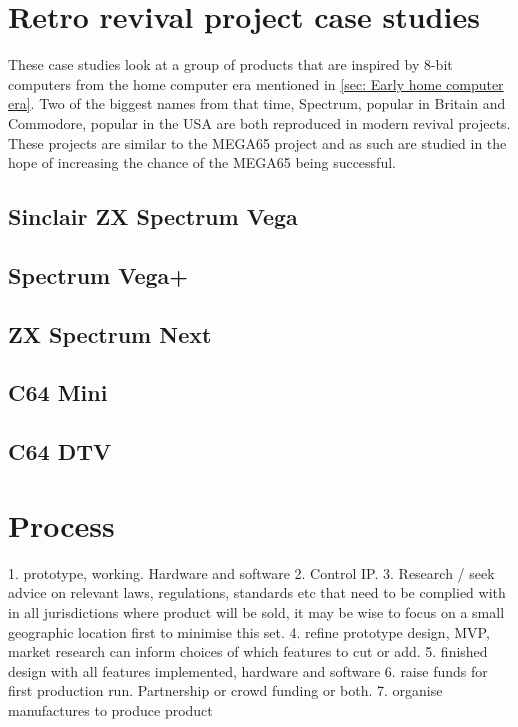\section{Retro revival project case studies}
These case studies look at a group of products that are inspired by 8-bit computers from the home computer era mentioned in \ref{sec: Early home computer era}. Two of the biggest names from that time, Spectrum, popular in Britain and Commodore, popular in the USA are both reproduced in modern revival projects. These projects are similar to the MEGA65 project and as such are studied in the hope of increasing the chance of the MEGA65 being successful. 

\subsection{Sinclair ZX Spectrum Vega}


\subsection{Spectrum Vega+}


\subsection{ZX Spectrum Next}


\subsection{C64 Mini}


\subsection{C64 DTV}


\section{Process}
1. prototype, working. Hardware and software
2. Control IP.
3. Research / seek advice on relevant laws, regulations, standards etc that need to be complied with in all jurisdictions where product will be sold, it may be wise to focus on a small geographic location first to minimise this set.
4. refine prototype design, MVP, market research can inform choices of which features to cut or add.
5. finished design with all features implemented, hardware and software
6. raise funds for first production run. Partnership or crowd funding or both.
7. organise manufactures to produce product